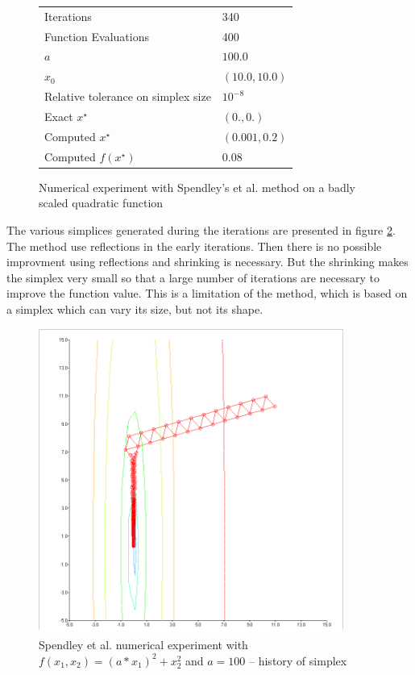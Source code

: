\begin{figure}[h]
\begin{center}
\begin{tiny}
\begin{tabular}{|l|l|}
\hline
Iterations & 340 \\
Function Evaluations & 400 \\
$a$ & $100.0$ \\
$x_0$ & $(10.0,10.0)$ \\
Relative tolerance on simplex size & $10^{-8}$ \\
Exact $x^\star$ & $(0.,0.)$\\
Computed $x^\star$ & $(0.001,0.2)$\\
Computed $f(x^\star)$ & $0.08$\\
\hline
\end{tabular}
\end{tiny}
\end{center}
\caption{Numerical experiment with Spendley's et al. method on a badly scaled quadratic function}
\label{fig-spendley-numexp2-table}
\end{figure}


The various simplices generated during the iterations are 
presented in figure \ref{fig-spendley-numexp2-historysimplex}.
The method use reflections in the early iterations. Then there
is no possible improvment using reflections and shrinking is necessary.
But the shrinking makes the simplex very small so that a large number of 
iterations are necessary to improve the function value.
This is a limitation of the method, which is based on a simplex 
which can vary its size, but not its shape.

\begin{figure}
\begin{center}
\includegraphics[width=10cm]{quad2-spendley-simplexcontours.png}
\end{center}
\caption{Spendley et al. numerical experiment with $f(x_1,x_2) = (a * x_1)^2 + x_2^2$ and $a=100$ -- history of simplex}
\label{fig-spendley-numexp2-historysimplex}
\end{figure}

